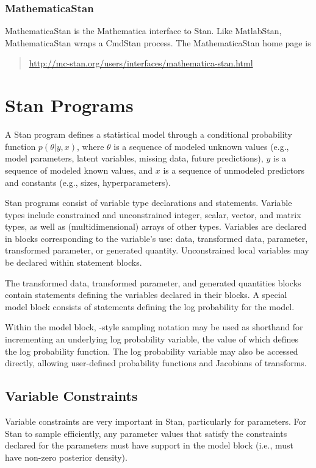 \subsubsection{MathematicaStan}

MathematicaStan is the Mathematica interface to Stan.  Like
MatlabStan, MathematicaStan wraps a CmdStan process.  The
MathematicaStan home page is
%
\begin{quote}
\url{http://mc-stan.org/users/interfaces/mathematica-stan.html}
\end{quote}


\section{Stan Programs}

A Stan program defines a statistical model through a conditional
probability function $p(\theta|y,x)$, where $\theta$ is a sequence of
modeled unknown values (e.g., model parameters, latent variables, missing
data, future predictions), $y$ is a sequence of modeled known
values, and $x$ is a sequence of unmodeled predictors and constants
(e.g., sizes, hyperparameters).

Stan programs consist of variable type declarations and statements.
Variable types include constrained and unconstrained integer, scalar,
vector, and matrix types, as well as (multidimensional) arrays of
other types.  Variables are declared in blocks corresponding to the
variable's use: data, transformed data, parameter, transformed
parameter, or generated quantity.  Unconstrained local variables may
be declared within statement blocks.

The transformed data, transformed parameter, and generated quantities
blocks contain statements defining the variables declared in their
blocks.  A special model block consists of statements defining the log
probability for the model.

Within the model block, \BUGS-style sampling notation may be used as
shorthand for incrementing an underlying log probability variable, the
value of which defines the log probability function.  The log
probability variable may also be accessed directly, allowing
user-defined probability functions and Jacobians of transforms.

\subsection{Variable Constraints}

Variable constraints are very important in Stan, particularly for
parameters.  For Stan to sample efficiently, any parameter values that
satisfy the constraints declared for the parameters must have support
in the model block (i.e., must have non-zero posterior density).

